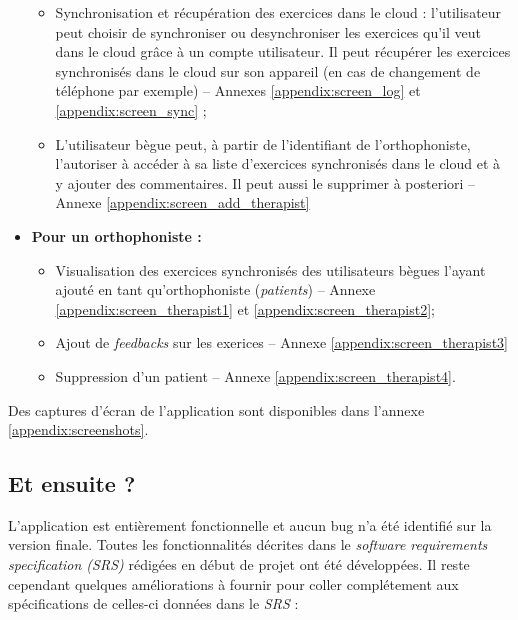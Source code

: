 \begin{itemize}
\begin{itemize}
    \item Synchronisation et récupération des exercices dans le cloud : l'utilisateur peut choisir de synchroniser ou desynchroniser les exercices qu'il veut dans le cloud grâce à un compte utilisateur. Il peut récupérer les exercices synchronisés dans le cloud sur son appareil (en cas de changement de téléphone par exemple) -- Annexes \ref{appendix:screen_log} et \ref{appendix:screen_sync} ;
    \item L'utilisateur bègue peut, à partir de l'identifiant de l'orthophoniste, l'autoriser à accéder à sa liste d'exercices synchronisés dans le cloud et à y ajouter des commentaires. Il peut aussi le supprimer à posteriori -- Annexe \ref{appendix:screen_add_therapist}
  \end{itemize}

  \item \textbf{Pour un orthophoniste :}
  \begin{itemize}
    \item Visualisation des exercices synchronisés des utilisateurs bègues l'ayant ajouté en tant qu'orthophoniste (\textit{patients}) -- Annexe \ref{appendix:screen_therapist1} et \ref{appendix:screen_therapist2};
    \item Ajout de \textit{feedbacks} sur les exerices -- Annexe \ref{appendix:screen_therapist3}
    \item Suppression d'un patient -- Annexe \ref{appendix:screen_therapist4}.
  \end{itemize}
\end{itemize}

Des captures d'écran de l'application sont disponibles dans l'annexe \ref{appendix:screenshots}.

\subsection{Et ensuite ?}
L'application est entièrement fonctionnelle et aucun bug n'a été identifié sur la version finale. Toutes les fonctionnalités décrites dans le \textit{software requirements specification (SRS)} rédigées en début de projet ont été développées. Il reste cependant quelques améliorations à fournir pour coller complétement aux spécifications de celles-ci données dans le \textit{SRS} :

